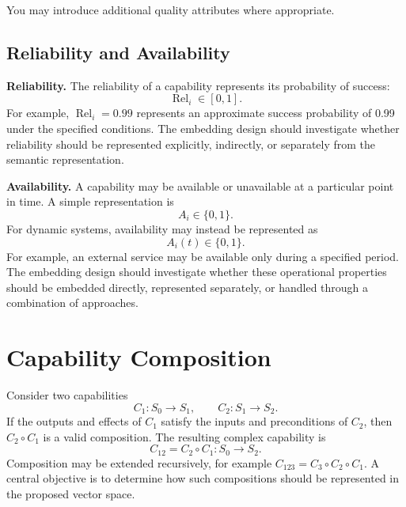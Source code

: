 \documentclass[11pt]{article}
\begin{document}
You may introduce additional quality attributes where appropriate.

\subsection{Reliability and Availability}

\textbf{Reliability.} The reliability of a capability represents its probability of
success:
\[
  \operatorname{Rel}_i\in[0,1].
\]
For example, \(\operatorname{Rel}_i=0.99\) represents an approximate success probability
of 0.99 under the specified conditions. The embedding design should investigate whether
reliability should be represented explicitly, indirectly, or separately from the semantic
representation.

\textbf{Availability.} A capability may be available or unavailable at a particular point
in time. A simple representation is
\[
  A_i\in\{0,1\}.
\]
For dynamic systems, availability may instead be represented as
\[
  A_i(t)\in\{0,1\}.
\]
For example, an external service may be available only during a specified period. The
embedding design should investigate whether these operational properties should be embedded
directly, represented separately, or handled through a combination of approaches.

\section{Capability Composition}

Consider two capabilities
\[
  C_1:S_0\rightarrow S_1,\qquad C_2:S_1\rightarrow S_2.
\]
If the outputs and effects of \(C_1\) satisfy the inputs and preconditions of \(C_2\), then
\(C_2\circ C_1\) is a valid composition. The resulting complex capability is
\[
  C_{12}=C_2\circ C_1:S_0\rightarrow S_2.
\]
Composition may be extended recursively, for example
\(C_{123}=C_3\circ C_2\circ C_1\). A central objective is to determine how such
compositions should be represented in the proposed vector space.

\begin{center}
\end{center}
\end{document}
